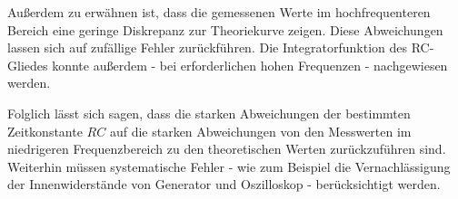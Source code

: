 Außerdem zu erwähnen ist, dass die gemessenen Werte im hochfrequenteren Bereich eine geringe
Diskrepanz zur Theoriekurve zeigen. Diese Abweichungen lassen sich auf zufällige Fehler zurückführen.
Die Integratorfunktion des RC-Gliedes konnte außerdem - bei erforderlichen hohen Frequenzen -
nachgewiesen werden.

Folglich lässt sich sagen, dass die starken Abweichungen der bestimmten Zeitkonstante $RC$ auf die starken Abweichungen von den Messwerten im niedrigeren Frequenzbereich zu den theoretischen Werten zurückzuführen sind.
Weiterhin müssen systematische Fehler - wie zum Beispiel die Vernachlässigung der Innenwiderstände von Generator und Oszilloskop - berücksichtigt werden.
